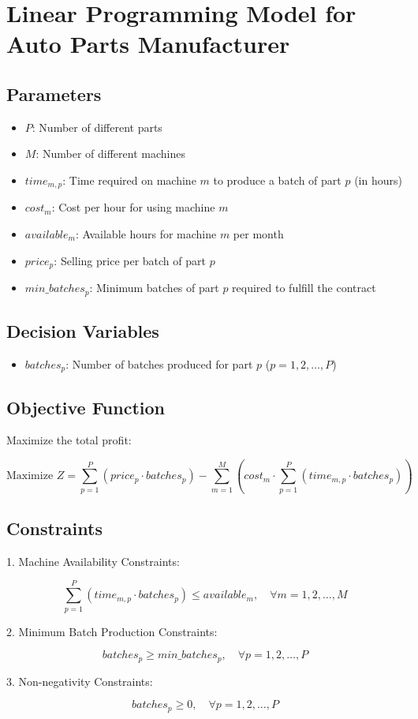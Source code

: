 \documentclass{article}
\begin{document}
\section*{Linear Programming Model for Auto Parts Manufacturer}

\subsection*{Parameters}
\begin{itemize}
    \item $P$: Number of different parts
    \item $M$: Number of different machines
    \item $time_{m,p}$: Time required on machine $m$ to produce a batch of part $p$ (in hours)
    \item $cost_{m}$: Cost per hour for using machine $m$
    \item $available_{m}$: Available hours for machine $m$ per month
    \item $price_{p}$: Selling price per batch of part $p$
    \item $min\_batches_{p}$: Minimum batches of part $p$ required to fulfill the contract
\end{itemize}

\subsection*{Decision Variables}
\begin{itemize}
    \item $batches_{p}$: Number of batches produced for part $p$ ($p = 1, 2, \ldots, P$)
\end{itemize}

\subsection*{Objective Function}
Maximize the total profit:

\[
\text{Maximize } Z = \sum_{p=1}^{P} (price_{p} \cdot batches_{p}) - \sum_{m=1}^{M} (cost_{m} \cdot \sum_{p=1}^{P} (time_{m,p} \cdot batches_{p}))
\]

\subsection*{Constraints}
1. Machine Availability Constraints:

\[
\sum_{p=1}^{P} (time_{m,p} \cdot batches_{p}) \leq available_{m}, \quad \forall m = 1, 2, \ldots, M
\]

2. Minimum Batch Production Constraints:

\[
batches_{p} \geq min\_batches_{p}, \quad \forall p = 1, 2, \ldots, P
\]

3. Non-negativity Constraints:

\[
batches_{p} \geq 0, \quad \forall p = 1, 2, \ldots, P
\]
\end{document}
